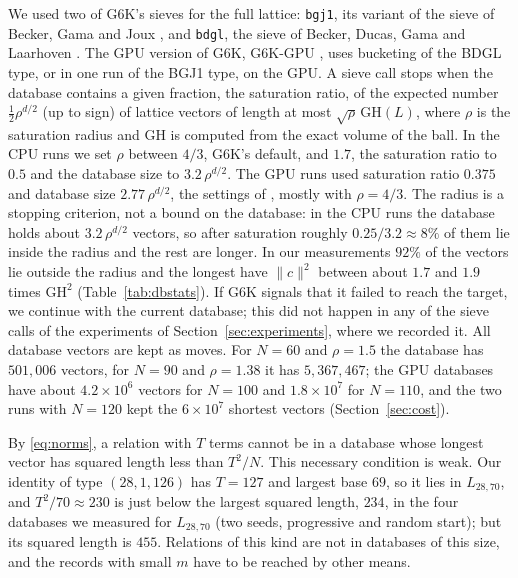 \documentclass[11pt]{amsart}
\theoremstyle{definition}
\theoremstyle{remark}
\newcommand{\GH}{\mathrm{GH}}
\begin{document}
We used two of G6K's sieves for the full lattice: \texttt{bgj1}, its variant of the sieve of
Becker, Gama and Joux \cite{BeckerGamaJoux2015}, and \texttt{bdgl}, the sieve of Becker, Ducas,
Gama and Laarhoven \cite{BeckerDucasGamaLaarhoven2016}. The GPU version of G6K, G6K-GPU
\cite{DucasStevensVanWoerden2021}, uses bucketing of the BDGL type, or in one run of the BGJ1
type, on the GPU. A sieve call stops when the database contains a given fraction, the
saturation ratio, of the expected number $\tfrac12\rho^{d/2}$ (up to sign) of lattice vectors of
length at most $\sqrt\rho\,\GH(L)$, where $\rho$ is the saturation radius and $\GH$ is computed
from the exact volume of the ball. In the CPU runs we set $\rho$ between $4/3$, G6K's default,
and $1.7$, the saturation ratio to $0.5$ and the database size to $3.2\,\rho^{d/2}$. The GPU
runs used saturation ratio $0.375$ and database size $2.77\,\rho^{d/2}$, the settings of
\cite{DucasStevensVanWoerden2021}, mostly with $\rho=4/3$. The radius is a stopping
criterion, not a bound on the database: in the CPU runs the database holds about
$3.2\,\rho^{d/2}$ vectors, so after saturation roughly $0.25/3.2\approx8\%$ of them lie
inside the radius and the rest are longer. In our measurements $92\%$ of the vectors lie
outside the radius and the longest have $\|c\|^2$ between about $1.7$ and $1.9$ times $\GH^2$
(Table~\ref{tab:dbstats}). If G6K signals that it failed to reach the target, we continue with
the current database; this did not happen in any of the \SatSieves{} sieve calls of the
experiments of Section~\ref{sec:experiments}, where we recorded it. All database vectors are
kept as moves. For $N=60$ and $\rho=1.5$ the database has $501{,}006$ vectors, for $N=90$ and
$\rho=1.38$ it has $5{,}367{,}467$; the GPU databases have about $4.2\times10^6$ vectors for
$N=100$ and $1.8\times10^7$ for $N=110$, and the two runs with $N=120$ kept the $6\times10^7$
shortest vectors (Section~\ref{sec:cost}).

By \eqref{eq:norms}, a relation with $T$ terms cannot be in a database whose longest vector has
squared length less than $T^2/N$. This necessary condition is weak. Our identity of type
$(28,1,126)$ has $T=127$ and largest base $69$, so it lies in $L_{28,70}$, and
$T^2/70\approx230$ is just below the largest squared length, $234$, in the four databases we
measured for $L_{28,70}$ (two seeds, progressive and random start); but its squared length is
$455$. Relations of this kind are not in databases of this size, and the records with small $m$
have to be reached by other means.
\end{document}

